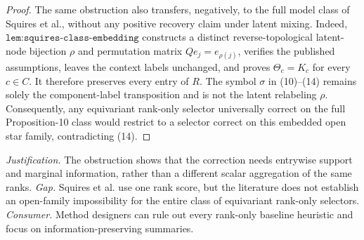 \documentclass{article}
\begin{document}
\begin{proof}
The same obstruction also transfers, negatively, to the full model class of Squires et al., without any positive recovery claim under latent mixing.  Indeed, \(\texttt{lem:squires-class-embedding}\) constructs a distinct reverse-topological latent-node bijection \(\rho\) and permutation matrix \(Qe_j=e_{\rho(j)}\), verifies the published assumptions, leaves the context labels unchanged, and proves \(\Theta_c=K_c\) for every \(c\in C\).  It therefore preserves every entry of \(R\).  The symbol \(\sigma\) in (10)--(14) remains solely the component-label transposition and is not the latent relabeling \(\rho\).  Consequently, any equivariant rank-only selector universally correct on the full Proposition-10 class would restrict to a selector correct on this embedded open star family, contradicting (14).
\end{proof}
\par\smallskip\noindent \textit{Justification.} The obstruction shows that the correction needs entrywise support and marginal information, rather than a different scalar aggregation of the same ranks. \textit{Gap.} Squires et al. use one rank score, but the literature does not establish an open-family impossibility for the entire class of equivariant rank-only selectors. \textit{Consumer.} Method designers can rule out every rank-only baseline heuristic and focus on information-preserving summaries.
\end{document}
